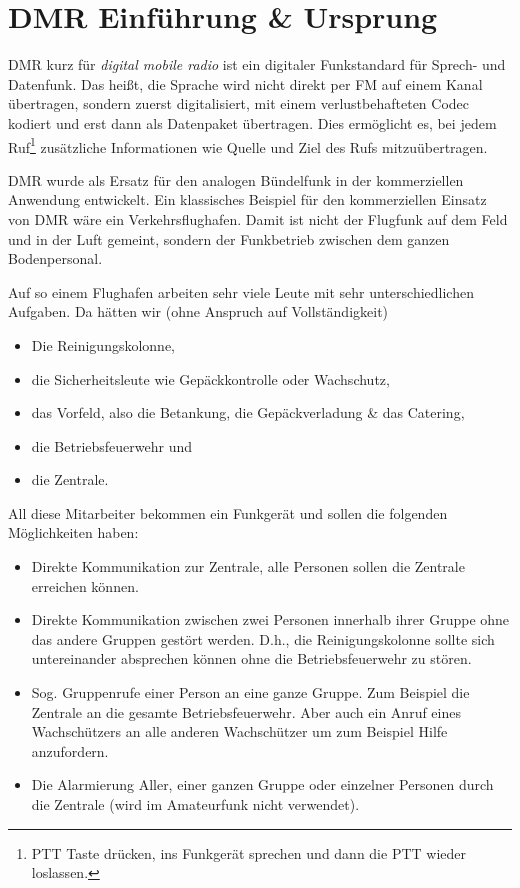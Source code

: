 \section{DMR Einführung \& Ursprung} \label{sec:ursprung}
DMR kurz für \emph{digital mobile radio} ist ein digitaler Funkstandard für Sprech- und Datenfunk. Das heißt, die Sprache wird nicht direkt per FM  auf einem Kanal übertragen, sondern zuerst digitalisiert, mit einem verlustbehafteten Codec kodiert und erst dann als Datenpaket übertragen. Dies ermöglicht es, bei jedem Ruf\footnote{PTT Taste drücken, ins Funkgerät sprechen und dann die PTT wieder loslassen.} zusätzliche Informationen wie Quelle und Ziel des Rufs mitzuübertragen.

DMR wurde als Ersatz für den analogen Bündelfunk in der kommerziellen Anwendung entwickelt. Ein klassisches Beispiel für den kommerziellen Einsatz von DMR wäre ein Verkehrsflughafen. Damit ist nicht der Flugfunk auf dem Feld und in der Luft gemeint, sondern der Funkbetrieb zwischen dem ganzen Bodenpersonal. 

Auf so einem Flughafen arbeiten sehr viele Leute mit sehr unterschiedlichen Aufgaben. Da hätten wir (ohne Anspruch auf Vollständigkeit)
\begin{itemize}
 \item Die Reinigungskolonne,
 \item die Sicherheitsleute wie Gepäckkontrolle oder Wachschutz,
 \item das Vorfeld, also die Betankung, die Gepäckverladung \& das Catering, 
 \item die Betriebsfeuerwehr und
 \item die Zentrale.
\end{itemize}

All diese Mitarbeiter bekommen ein Funkgerät und sollen die folgenden Möglichkeiten haben:
\begin{itemize}
 \item Direkte Kommunikation zur Zentrale, alle Personen sollen die Zentrale erreichen können.
 \item Direkte Kommunikation zwischen zwei Personen innerhalb ihrer Gruppe ohne das andere Gruppen gestört werden. D.h., die Reinigungskolonne sollte sich untereinander absprechen können ohne die Betriebsfeuerwehr zu stören.
 \item Sog. Gruppenrufe einer Person an eine ganze Gruppe. Zum Beispiel die Zentrale an die gesamte Betriebsfeuerwehr. Aber auch ein Anruf eines Wachschützers an alle anderen Wachschützer um zum Beispiel Hilfe anzufordern. 
 \item Die Alarmierung Aller, einer ganzen Gruppe oder einzelner Personen durch die Zentrale (wird im Amateurfunk nicht verwendet).
\end{itemize}
 
